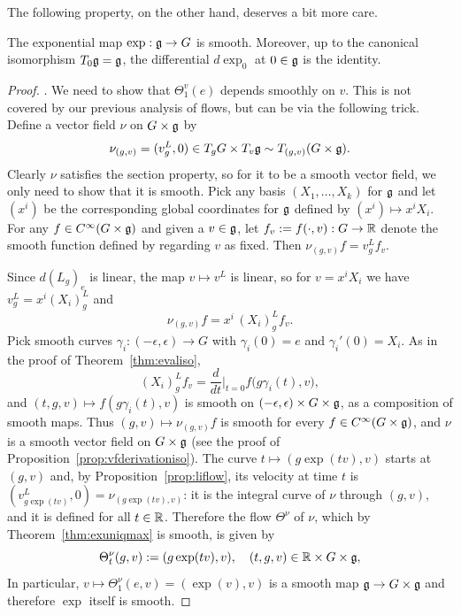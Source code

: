 The following property, on the other hand, deserves a bit more care.
\begin{theorem}
	The exponential map $\exp:\mathfrak{g}\to G$ is smooth.
	Moreover, up to the canonical isomorphism $T_0\mathfrak{g} = \mathfrak{g}$, the differential $d\exp_0$ at $0\in\mathfrak{g}$ is the identity.
\end{theorem}
\begin{proof}
	. We need to show that $\Theta_1^v(e)$ depends smoothly on $v$.
	This is not covered by our previous analysis of flows, but can be via the following trick.
	Define a vector field $\nu$ on $G\times\mathfrak{g}$ by
	\begin{equation}
		\nu_{(g,v)} = (v^L_g, 0)\in T_gG\times T_v\mathfrak{g} \sim T_{(g,v)}(G\times \mathfrak{g}).
	\end{equation}
	Clearly $\nu$ satisfies the section property, so for it to be a smooth vector field, we only need to show that it is smooth.
	Pick any basis $(X_1,\ldots,X_k)$ for $\mathfrak{g}$ and let $(x^i)$ be the corresponding global coordinates for $\mathfrak{g}$ defined by $(x^i)\mapsto x^i X_i$.
	For any $f\in C^\infty(G\times\mathfrak{g})$ and given a $v\in\mathfrak{g}$, let $f_v:= f(\cdot, v):G\to\mathbb{R}$ denote the smooth function defined by regarding $v$ as fixed.
	Then $\nu_{(g,v)}f = v^L_g f_v$.

	Since $d(L_g)_e$ is linear, the map $v\mapsto v^L$ is linear, so for $v = x^iX_i$ we have $v^L_g = x^i (X_i)^L_g$ and
	\begin{equation}
		\nu_{(g,v)}f = x^i\, (X_i)^L_g f_v.
	\end{equation}
	Pick smooth curves $\gamma_i:(-\epsilon,\epsilon)\to G$ with $\gamma_i(0)=e$ and $\gamma_i'(0)=X_i$.
	As in the proof of Theorem~\ref{thm:evaliso},
	\begin{equation}
		(X_i)^L_g f_v = \frac{d}{dt}\Big|_{t=0} f\big(g\gamma_i(t), v\big),
	\end{equation}
	and $(t,g,v)\mapsto f(g\gamma_i(t),v)$ is smooth on $(-\epsilon,\epsilon)\times G\times\mathfrak{g}$, as a composition of smooth maps.
	Thus $(g,v)\mapsto \nu_{(g,v)}f$ is smooth for every $f\in C^\infty(G\times\mathfrak{g})$, and $\nu$ is a smooth vector field on $G\times\mathfrak{g}$ (see the proof of Proposition~\ref{prop:vfderivationiso}).
	The curve $t\mapsto(g\exp(tv), v)$ starts at $(g,v)$ and, by Proposition~\ref{prop:liflow}, its velocity at time $t$ is $(v^L_{g\exp(tv)},0) = \nu_{(g\exp(tv),v)}$: it is the integral curve of $\nu$ through $(g,v)$, and it is defined for all $t\in\mathbb{R}$.
	Therefore the flow $\Theta^\nu$ of $\nu$, which by Theorem~\ref{thm:exuniqmax} is smooth, is given by
	\begin{equation}
		\Theta^\nu_t(g,v) := (g \exp(tv), v), \quad (t,g,v)\in\mathbb{R}\times G\times\mathfrak{g},
	\end{equation}
	In particular, $v\mapsto\Theta^\nu_1(e,v) = (\exp(v), v)$ is a smooth map $\mathfrak{g}\to G\times\mathfrak{g}$ and therefore $\exp$ itself is smooth.


\end{proof}
